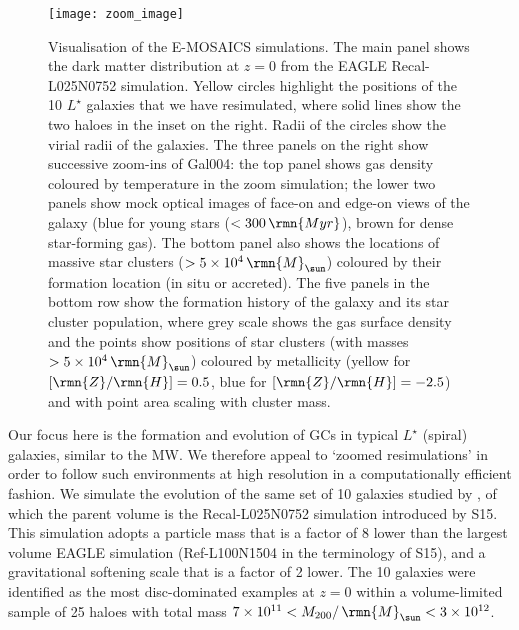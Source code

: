 \documentclass[fleqn,usenatbib]{mnras}
\newcommand\Msun{\,\rmn{M}_{\sun}}
\newcommand\Myr{\,\rmn{Myr}}
\newcommand\ZH{\lbrack \rmn{Z}/\rmn{H} \rbrack}
\begin{document}
\begin{figure*}
  \texttt{[image: zoom\_image]}
  \caption{ Visualisation of the E-MOSAICS simulations. The main panel shows the dark matter distribution at $z=0$ from the EAGLE Recal-L025N0752 simulation. Yellow circles highlight the positions of the 10 $L^\star$ galaxies that we have resimulated, where solid lines show the two haloes in the inset on the right. Radii of the circles show the virial radii of the galaxies. The three panels on the right show successive zoom-ins of Gal004: the top panel shows gas density coloured by temperature in the zoom simulation; the lower two panels show mock optical images of face-on and edge-on views of the galaxy (blue for young stars ($<300\Myr$), brown for dense star-forming gas). The bottom panel also shows the locations of massive star clusters ($>5\times10^4 \Msun$) coloured by their formation location (in situ or accreted). The five panels in the bottom row show the formation history of the galaxy and its star cluster population, where grey scale shows the gas surface density and the points show positions of star clusters (with masses $>5\times10^4 \Msun$) coloured by metallicity (yellow for $\ZH=0.5$, blue for $\ZH=-2.5$) and with point area scaling with cluster mass. }

  \label{fig:visualisation}
\end{figure*}

Our focus here is the formation and evolution of GCs in typical $L^\star$ (spiral) galaxies, similar to the MW. We therefore appeal to `zoomed resimulations' \citep[e.g.][]{Katz_and_White_93} in order to follow such environments at high resolution in a computationally efficient fashion. We simulate the evolution of the same set of 10 galaxies studied by \citet{Mateu_et_al_17}, of which the parent volume is the Recal-L025N0752 simulation introduced by S15. This simulation adopts a particle mass that is a factor of 8 lower than the largest volume EAGLE simulation (Ref-L100N1504 in the terminology of S15), and a gravitational softening scale that is a factor of 2 lower. The 10 galaxies were identified as the most disc-dominated examples at $z=0$ within a volume-limited sample of 25 haloes with  total mass $7\times 10^{11} < M_{200}/\Msun < 3 \times 10^{12}$.
\end{document}
